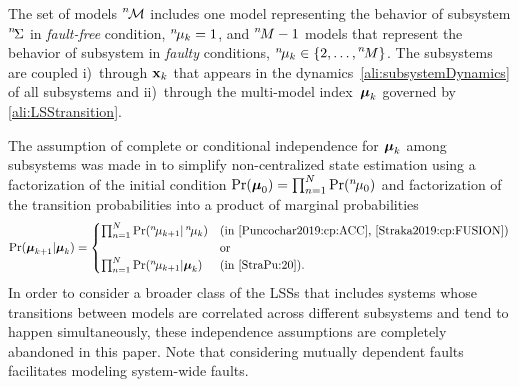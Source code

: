 \documentclass[conference,letterpaper]{IEEEtran}
\def\ist{\prescript{1\!}{}}
\def\nth{\prescript{n\!}{}}
\def\Nth{\prescript{N\!}{}}
\begin{document}
The set of models $\nth{\mcM}$ includes one model representing the behavior of subsystem $\nth{\Sigma}$ in \emph{fault-free} condition, $\nth{\mu}_{k}=1$, and $\nth{M}-1$ models that represent the behavior of subsystem in \emph{faulty} conditions, $\nth{\mu}_{k}\in\{2,\ldots,\nth{M}\}$.  
The subsystems are coupled i)~through $\mathbf{x}_k$ that appears in the dynamics~\eqref{ali:subsystemDynamics} of all subsystems and ii)~through the multi-model index~$\boldsymbol{\mu}_k$ governed by \eqref{ali:LSStransition}.


The assumption of complete or conditional independence for $\boldsymbol{\mu}_{k}$ among subsystems was made in  \cite{Puncochar2019:cp:ACC,Straka2019:cp:FUSION,StraPu:20} to simplify non-centralized state estimation using a factorization of the initial condition $\Pr(\bfmu_{0})=\prod_{n=1}^{N}\Pr(\nth{\mu}_{0})$ and factorization of the transition probabilities into a product of marginal probabilities
\begin{align}
	\Pr(\bfmu_{k+1}|\bfmu_{k})=
  \begin{cases}
    \prod_{n=1}^N\Pr(\nth{\mu}_{k+1}|\nth{\mu}_{k}) & \text{(in~\cite{Puncochar2019:cp:ACC},~\cite{Straka2019:cp:FUSION})}\\
                                                    &\text{or}\\
    \prod_{n=1}^N\Pr(\nth{\mu}_{k+1}|\bfmu_{k}) & \text{(in~\cite{StraPu:20})}.
  \end{cases}
\end{align}
In order to consider a broader class of the LSSs that includes systems whose transitions between models are correlated across different subsystems and tend to happen simultaneously, these independence assumptions are completely abandoned in this paper.
Note that considering mutually dependent faults facilitates modeling system-wide faults.
\end{document}
